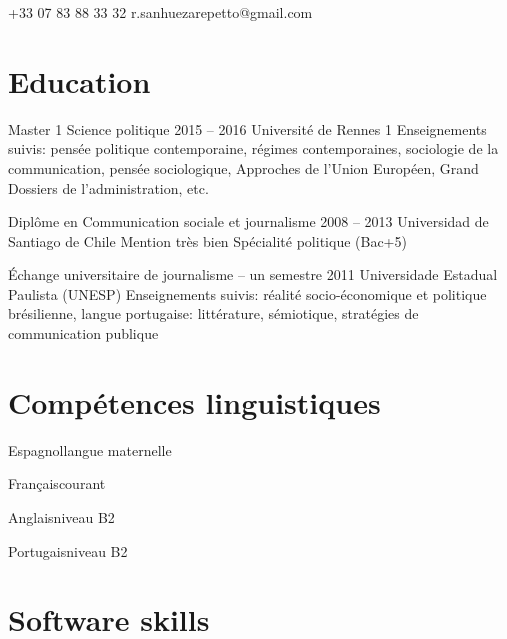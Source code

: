 \documentclass{tccv}
\begin{document}
    {+33 07 83 88 33 32}
    {r.sanhuezarepetto@gmail.com}

\section{Education}

\begin{yearlist}

\item[Master 1 Science politique]{2015 -- 2016}
     {Université de Rennes 1}
     {Enseignements suivis: pensée politique contemporaine, régimes contemporaines, sociologie de la communication, pensée sociologique, Approches de l’Union Européen, Grand Dossiers de l’administration, etc.}


  

\item[Diplôme en Communication sociale et journalisme]{2008 -- 2013}
     {Universidad de Santiago de Chile}
     {Mention très bien
      Spécialité politique
      (Bac+5)}
   
     
\item[Échange universitaire de journalisme – un semestre]{2011}
     {Universidade Estadual Paulista (UNESP)}
     {Enseignements suivis: réalité socio-économique et politique brésilienne, langue portugaise: littérature, sémiotique, stratégies de communication publique}





     
     
     

\end{yearlist}



\section{Compétences linguistiques}

\begin{factlist}
\item{Espagnol}{langue maternelle}	
\item{Français}{courant}	
\item{Anglais}{niveau B2}	
\item{Portugais}{niveau B2}
\end{factlist}

\section{Software skills}
\end{document}
